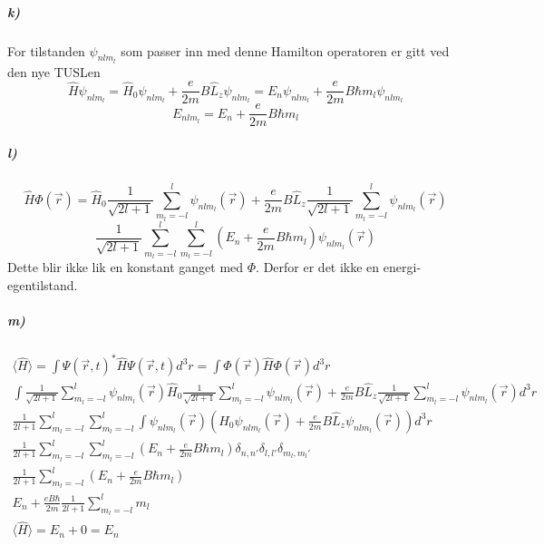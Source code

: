 \documentclass[11pt, A4paper,norsk]{article}
\begin{document}
			\subparagraph{k)}
				\begin{flushleft}
For tilstanden $\psi_{nlm_{l}}$ som passer inn med denne Hamilton operatoren er gitt ved den nye TUSLen
$$\hat{H} \psi_{nlm_{l}} = \hat{H}_0 \psi_{nlm_{l}} + \frac{e}{2m} B \hat{L}_z \psi_{nlm_{l}} = E_n \psi_{nlm_{l}} + \frac{e}{2m} B \hbar m_l \psi_{nlm_{l}}$$
$$E_{nlm_l} = E_n + \frac{e}{2m} B \hbar m_l$$
				\end{flushleft}








			\subparagraph{l)}
				\begin{flushleft}
$$\hat{H} \Phi(\vec{r}) = \hat{H}_0 \frac{1}{\sqrt{2l + 1}} \sum_{m_l = -l}^{l} \psi_{nlm_{l}}(\vec{r}) + \frac{e}{2m} B \hat{L}_z \frac{1}{\sqrt{2l + 1}} \sum_{m_l = -l}^{l} \psi_{nlm_{l}}(\vec{r})$$
$$\frac{1}{\sqrt{2l + 1}} \sum_{m_l = -l}^{l} \sum_{m_l = -l}^{l} \left(E_n + \frac{e}{2m} B \hbar m_l \right) \psi_{nlm_{l}}(\vec{r})$$
Dette blir ikke lik en konstant ganget med $\Phi$. Derfor er det ikke en energi-egentilstand.
				\end{flushleft}









			\subparagraph{m)}
				\begin{gather*}
\langle \hat{H} \rangle = \int \Psi(\vec{r}, t)^{*} \hat{H} \Psi(\vec{r}, t) d^3r = \int \Phi(\vec{r}) \hat{H} \Phi(\vec{r}) d^3r \\
\int \frac{1}{\sqrt{2l + 1}} \sum_{m_l = -l}^{l} \psi_{nlm_{l}}(\vec{r}) \hat{H}_0 \frac{1}{\sqrt{2l + 1}} \sum_{m_l = -l}^{l} \psi_{nlm_{l}}(\vec{r}) + \frac{e}{2m} B \hat{L}_z \frac{1}{\sqrt{2l + 1}} \sum_{m_l = -l}^{l} \psi_{nlm_{l}}(\vec{r}) d^3r \\
\frac{1}{2l + 1} \sum_{m_l = -l}^{l} \sum_{m_l = -l}^{l} \int \psi_{nlm_{l}}(\vec{r}) \left( \hat{H}_0 \psi_{nlm_{l}}(\vec{r}) + \frac{e}{2m} B \hat{L}_z \psi_{nlm_{l}}(\vec{r}) \right) d^3r \\
\frac{1}{2l + 1} \sum_{m_l = -l}^{l} \sum_{m_l = -l}^{l} \left( E_n  + \frac{e}{2m} B \hbar m_l  \right) \delta_{n, n'} \delta_{l, l'} \delta_{m_l, m_l'} \\
\frac{1}{2l + 1} \sum_{m_l = -l}^{l} \left( E_n  + \frac{e}{2m} B \hbar m_l  \right) \\
E_n + \frac{e B \hbar}{2m} \frac{1}{2l + 1} \sum_{m_l = -l}^{l} m_l \\
\langle \hat{H} \rangle = E_n + 0 = E_n
				\end{gather*}
\end{document}
